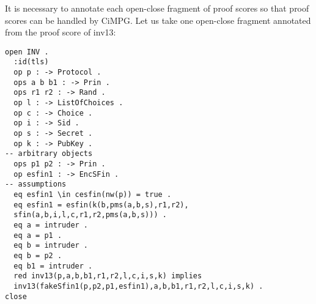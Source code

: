 \documentclass[a4paper,fleqn]{cas-dc}
\begin{document}

It is necessary to annotate each open-close fragment of proof
scores so that proof scores can be handled by CiMPG. Let us take
one open-close fragment annotated from the proof score of inv13:
\begin{small}
\begin{verbatim}
open INV .
  :id(tls)
  op p : -> Protocol .
  ops a b b1 : -> Prin .
  ops r1 r2 : -> Rand .
  op l : -> ListOfChoices .
  op c : -> Choice .
  op i : -> Sid .
  op s : -> Secret .
  op k : -> PubKey .
-- arbitrary objects
  ops p1 p2 : -> Prin .
  op esfin1 : -> EncSFin .
-- assumptions
  eq esfin1 \in cesfin(nw(p)) = true .
  eq esfin1 = esfin(k(b,pms(a,b,s),r1,r2),
  sfin(a,b,i,l,c,r1,r2,pms(a,b,s))) .
  eq a = intruder .
  eq a = p1 .
  eq b = intruder .
  eq b = p2 .
  eq b1 = intruder . 
  red inv13(p,a,b,b1,r1,r2,l,c,i,s,k) implies
  inv13(fakeSfin1(p,p2,p1,esfin1),a,b,b1,r1,r2,l,c,i,s,k) .
close
\end{verbatim}
\end{small}
\end{document}
